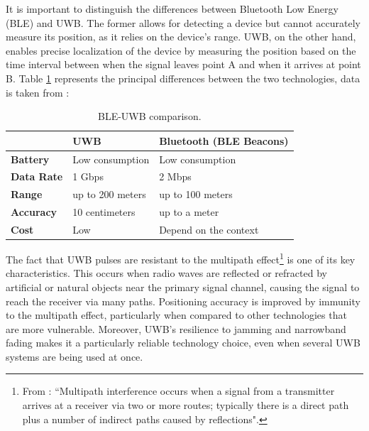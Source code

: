 \documentclass[english]{article}
\newcounter{subsubsubsection}[subsubsection]
\begin{document}
It is important to distinguish the differences between Bluetooth Low Energy (BLE) and UWB. The former allows for detecting a device but cannot accurately measure its position, as it relies on the device's range. UWB, on the other hand, enables precise localization of the device by measuring the position based on the time interval between when the signal leaves point A and when it arrives at point B.
Table \ref{tableu} represents the principal differences between the two technologies, data is taken from \cite{encstore}:
\begin{table}[h] 
\caption{BLE-UWB comparison.}
  \centering
  
    \begin{tabular}{l|l|l|}
      \cline{2-3}
      {}                               & {\textbf{UWB}}                & { \textbf{Bluetooth (BLE Beacons)}} \\ \hline
      \multicolumn{1}{|l|}{{  \textbf{Battery}}}  & {  Low consumption}             & {  Low consumption}                  \\ \hline
      \multicolumn{1}{|l|}{{  \textbf{Data Rate}}}  & { 1 Gbps }             & { 2 Mbps }                  \\ \hline
      \multicolumn{1}{|l|}{{  \textbf{Range}}}    & {  up to 200 meters} & {  up to 100 meters}       \\ \hline
      \multicolumn{1}{|l|}{{  \textbf{Accuracy}}} & {  10 centimeters} & {  up to a meter}                    \\ \hline
      \multicolumn{1}{|l|}{{  \textbf{Cost}}}     & {  Low}                         & {Depend on the context }                              \\ \hline
    \end{tabular}
    \label{tableu}
  \end{table}

The fact that UWB pulses are resistant to the multipath effect\footnote{From \cite{Figueroa2022}: ``Multipath interference occurs when a signal from a transmitter arrives at a receiver via two or more routes; typically there is a direct path plus a number of indirect paths caused by reflections".} is one of its key characteristics. This occurs when radio waves are reflected or refracted by artificial or natural objects near the primary signal channel, causing the signal to reach the receiver via many paths. Positioning accuracy is improved by immunity to the multipath effect, particularly when compared to other technologies that are more vulnerable. Moreover, UWB's resilience to jamming and narrowband fading makes it a particularly reliable technology choice, even when several UWB systems are being used at once.
\end{document}
